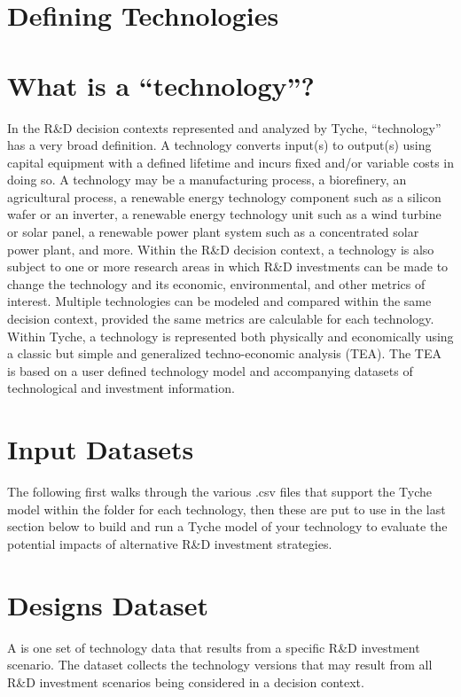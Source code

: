 \documentclass[letterpaper,10pt,english]{sphinxmanual}
\begin{document}
\section{Defining Technologies}
\label{\detokenize{cheat-sheet:defining-technologies}}

\section{What is a “technology”?}
\label{\detokenize{cheat-sheet:what-is-a-technology}}
In the R\&D decision contexts represented and analyzed by Tyche, “technology” has a very broad definition. A technology converts input(s) to output(s) using capital equipment with a defined lifetime and incurs fixed and/or variable costs in doing so. A technology may be a manufacturing process, a biorefinery, an agricultural process, a renewable energy technology component such as a silicon wafer or an inverter, a renewable energy technology unit such as a wind turbine or solar panel, a renewable power plant system such as a concentrated solar power plant, and more. Within the R\&D decision context, a technology is also subject to one or more research areas in which R\&D investments can be made to change the technology and its economic, environmental, and other metrics of interest. Multiple technologies can be modeled and compared within the same decision context, provided the same metrics are calculable for each technology. Within Tyche, a technology is represented both physically and economically using a classic but simple and generalized techno-economic analysis (TEA). The TEA is based on a user defined technology model and accompanying datasets of technological and investment information.


\section{Input Datasets}
\label{\detokenize{cheat-sheet:input-datasets}}
The following first walks through the various .csv files that support the Tyche model within the folder for each technology, then these are put to use in the last section below to build and run a Tyche model of your technology to evaluate the potential impacts of alternative R\&D investment strategies.


\section{Designs Dataset}
\label{\detokenize{cheat-sheet:designs-dataset}}
A  is one set of technology data that results from a specific R\&D investment scenario. The  dataset collects the technology versions that may result from all R\&D investment scenarios being considered in a decision context.
\end{document}
